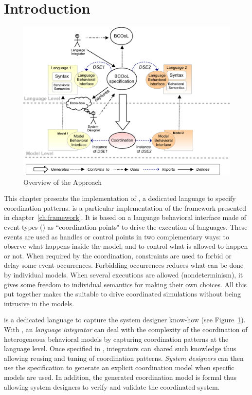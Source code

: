 \section{Introduction}
\label{sec:bcoolintro}

\begin{figure}
	\begin{center}
		\includegraphics[width=.8\textwidth]{framework/figs/bcool}
		\caption{Overview of the Approach}
		\label{fig:bcoolapp}
	\end{center}
\end{figure}

This chapter presents the implementation of \bcool, a dedicated language to specify coordination patterns. \bcool is a particular implementation of the framework presented in chapter~\ref{ch:framework}. It is based on a language behavioral interface made of event types (\ie \dse\cite{sle13-combemale}) as ``coordination points" to drive the execution of languages. These events are used as handles or control points in two complementary ways: to observe what happens inside the model, and to control what is allowed to happen or not. When required by the coordination, constraints are used to forbid or delay some event occurrences. Forbidding occurrences reduces what can be done by individual models. When several executions are allowed
(nondeterminism), it gives some freedom to individual semantics for making their own choices. All this put together makes the \dse suitable to drive coordinated simulations without being intrusive in the models. 

\bcool is a dedicated language to capture the system designer know-how (see Figure~\ref{fig:bcoolapp}). With \bcool, an \emph{language integrator} can deal with the complexity of the coordination of heterogeneous behavioral models by capturing coordination patterns at the language level. Once specified in \bcool, integrators can shared such knowledge thus allowing reusing and tuning of coordination patterns. \emph{System designers} can then use the \bcool specification to generate an explicit coordination model when specific models are used. In addition, the generated coordination model is formal thus allowing system designers to verify and validate the coordinated system.  

